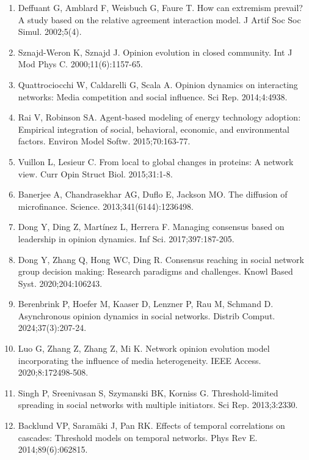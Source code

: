 \documentclass[10pt,letterpaper]{article}
\begin{document}
\begin{enumerate}
\item Deffuant G, Amblard F, Weisbuch G, Faure T.
How can extremism prevail? {A} study based on the relative agreement
  interaction model.
J Artif Soc Soc Simul. 2002;5(4).

\item Sznajd-Weron K, Sznajd J.
Opinion evolution in closed community.
Int J Mod Phys C. 2000;11(6):1157-65.

\item Quattrociocchi W, Caldarelli G, Scala A.
Opinion dynamics on interacting networks: Media competition and
  social influence.
Sci Rep. 2014;4:4938.

\item Rai V, Robinson SA.
Agent-based modeling of energy technology adoption: Empirical
  integration of social, behavioral, economic, and environmental factors.
Environ Model Softw. 2015;70:163-77.

\item Vuillon L, Lesieur C.
From local to global changes in proteins: A network view.
Curr Opin Struct Biol. 2015;31:1-8.

\item Banerjee A, Chandrasekhar AG, Duflo E, Jackson MO.
The diffusion of microfinance.
Science. 2013;341(6144):1236498.

\item Dong Y, Ding Z, Mart{\'i}nez L, Herrera F.
Managing consensus based on leadership in opinion dynamics.
Inf Sci. 2017;397:187-205.

\item Dong Y, Zhang Q, Hong WC, Ding R.
Consensus reaching in social network group decision making: Research
  paradigms and challenges.
Knowl Based Syst. 2020;204:106243.

\item Berenbrink P, Hoefer M, Kaaser D, Lenzner P, Rau M, Schmand D.
Asynchronous opinion dynamics in social networks.
Distrib Comput. 2024;37(3):207-24.

\item Luo G, Zhang Z, Zhang Z, Mi K.
Network opinion evolution model incorporating the influence of media
  heterogeneity.
IEEE Access. 2020;8:172498-508.

\item Singh P, Sreenivasan S, Szymanski BK, Korniss G.
Threshold-limited spreading in social networks with multiple
  initiators.
Sci Rep. 2013;3:2330.

\item Backlund VP, Saram{\"a}ki J, Pan RK.
Effects of temporal correlations on cascades: Threshold models on
  temporal networks.
Phys Rev E. 2014;89(6):062815.


\end{enumerate}
\end{document}
